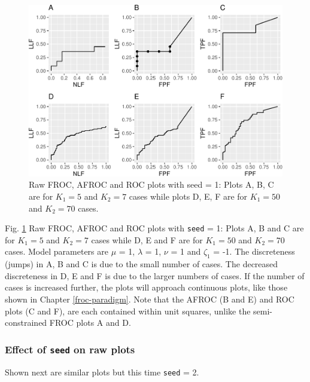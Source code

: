 \documentclass[
]{book}
\begin{document}
\begin{figure}
\centering
\includegraphics{13b-froc-empirical2_files/figure-latex/froc-afroc-roc-raw-seed1-1.pdf}
\caption{\label{fig:froc-afroc-roc-raw-seed1}Raw FROC, AFROC and ROC plots with seed = 1: Plots A, B, C are for \(K_1 = 5\) and \(K_2 = 7\) cases while plots D, E, F are for \(K_1 = 50\) and \(K_2 = 70\) cases.}
\end{figure}

Fig. \ref{fig:froc-afroc-roc-raw-seed1} Raw FROC, AFROC and ROC plots with \texttt{seed} = 1: Plots A, B and C are for \(K_1 = 5\) and \(K_2 = 7\) cases while D, E and F are for \(K_1 = 50\) and \(K_2 = 70\) cases. Model parameters are \(\mu\) = 1, \(\lambda\) = 1, \(\nu\) = 1 and \(\zeta_1\) = -1. The discreteness (jumps) in A, B and C is due to the small number of cases. The decreased discreteness in D, E and F is due to the larger numbers of cases. If the number of cases is increased further, the plots will approach continuous plots, like those shown in Chapter \ref{froc-paradigm}. Note that the AFROC (B and E) and ROC plots (C and F), are each contained within unit squares, unlike the semi-constrained FROC plots A and D.

\hypertarget{effect-of-seed-on-raw-plots}{%
\subsubsection{\texorpdfstring{Effect of \texttt{seed} on raw plots}{Effect of seed on raw plots}}\label{effect-of-seed-on-raw-plots}}

Shown next are similar plots but this time \texttt{seed} = 2.
\end{document}
